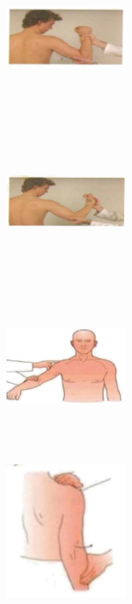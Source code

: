 \documentclass[a4paper,12pt,openany,twoside]{book}
\begin{document}
{\begin{figure}[H]
\begin{subfigure}[t]{.25\textwidth}
			\includegraphics[width=4cm,height=5cm]{./clinicalPhysioPic/motorSystem/flexorArm.jpg}
		\end{subfigure}
		\hspace{\fill}
		\begin{subfigure}[t]{.25\textwidth}
			\includegraphics[width=4cm,height=5cm]{./clinicalPhysioPic/motorSystem/extensorArm.jpg}
		\end{subfigure}
		\hspace{\fill}
		\begin{subfigure}[t]{.25\textwidth}
			\includegraphics[width=4cm,height=5cm]{./clinicalPhysioPic/motorSystem/deltoid.jpg}
		\end{subfigure}
		\hspace{\fill}
		\begin{subfigure}[t]{.25\textwidth}
			\includegraphics[width=4cm,height=5cm]{./clinicalPhysioPic/motorSystem/supraspinatus.jpg}

\end{subfigure}
\end{figure}}
\end{document}
